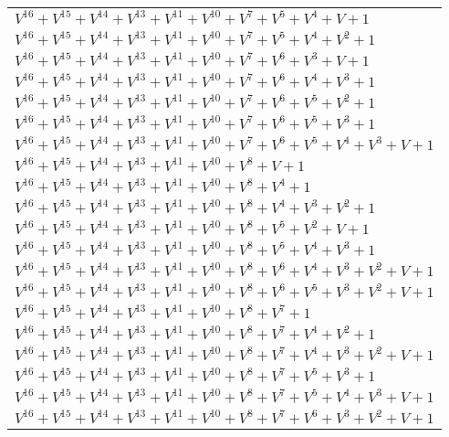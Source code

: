\documentclass[12pt]{article}
\begin{document}
\begin{adjustwidth}{-4cm}{}
\begin{center}
\begin{longtable}{|l|}
$V^{16}  +V^{15}  +V^{14}  +V^{13}  +V^{11}  +V^{10}  +V^{7}  +V^{5}  +V^{4}  + V + 1$ \\
$V^{16}  +V^{15}  +V^{14}  +V^{13}  +V^{11}  +V^{10}  +V^{7}  +V^{5}  +V^{4}  +V^{2}  + 1$ \\
$V^{16}  +V^{15}  +V^{14}  +V^{13}  +V^{11}  +V^{10}  +V^{7}  +V^{6}  +V^{3}  + V + 1$ \\
$V^{16}  +V^{15}  +V^{14}  +V^{13}  +V^{11}  +V^{10}  +V^{7}  +V^{6}  +V^{4}  +V^{3}  + 1$ \\
$V^{16}  +V^{15}  +V^{14}  +V^{13}  +V^{11}  +V^{10}  +V^{7}  +V^{6}  +V^{5}  +V^{2}  + 1$ \\
$V^{16}  +V^{15}  +V^{14}  +V^{13}  +V^{11}  +V^{10}  +V^{7}  +V^{6}  +V^{5}  +V^{3}  + 1$ \\
$V^{16}  +V^{15}  +V^{14}  +V^{13}  +V^{11}  +V^{10}  +V^{7}  +V^{6}  +V^{5}  +V^{4}  +V^{3}  + V + 1$ \\
$V^{16}  +V^{15}  +V^{14}  +V^{13}  +V^{11}  +V^{10}  +V^{8}  + V + 1$ \\
$V^{16}  +V^{15}  +V^{14}  +V^{13}  +V^{11}  +V^{10}  +V^{8}  +V^{4}  + 1$ \\
$V^{16}  +V^{15}  +V^{14}  +V^{13}  +V^{11}  +V^{10}  +V^{8}  +V^{4}  +V^{3}  +V^{2}  + 1$ \\
$V^{16}  +V^{15}  +V^{14}  +V^{13}  +V^{11}  +V^{10}  +V^{8}  +V^{5}  +V^{2}  + V + 1$ \\
$V^{16}  +V^{15}  +V^{14}  +V^{13}  +V^{11}  +V^{10}  +V^{8}  +V^{5}  +V^{4}  +V^{3}  + 1$ \\
$V^{16}  +V^{15}  +V^{14}  +V^{13}  +V^{11}  +V^{10}  +V^{8}  +V^{6}  +V^{4}  +V^{3}  +V^{2}  + V + 1$ \\
$V^{16}  +V^{15}  +V^{14}  +V^{13}  +V^{11}  +V^{10}  +V^{8}  +V^{6}  +V^{5}  +V^{3}  +V^{2}  + V + 1$ \\
$V^{16}  +V^{15}  +V^{14}  +V^{13}  +V^{11}  +V^{10}  +V^{8}  +V^{7}  + 1$ \\
$V^{16}  +V^{15}  +V^{14}  +V^{13}  +V^{11}  +V^{10}  +V^{8}  +V^{7}  +V^{4}  +V^{2}  + 1$ \\
$V^{16}  +V^{15}  +V^{14}  +V^{13}  +V^{11}  +V^{10}  +V^{8}  +V^{7}  +V^{4}  +V^{3}  +V^{2}  + V + 1$ \\
$V^{16}  +V^{15}  +V^{14}  +V^{13}  +V^{11}  +V^{10}  +V^{8}  +V^{7}  +V^{5}  +V^{3}  + 1$ \\
$V^{16}  +V^{15}  +V^{14}  +V^{13}  +V^{11}  +V^{10}  +V^{8}  +V^{7}  +V^{5}  +V^{4}  +V^{3}  + V + 1$ \\
$V^{16}  +V^{15}  +V^{14}  +V^{13}  +V^{11}  +V^{10}  +V^{8}  +V^{7}  +V^{6}  +V^{3}  +V^{2}  + V + 1$ \\

\end{longtable}
\end{center}
\end{adjustwidth}
\end{document}

